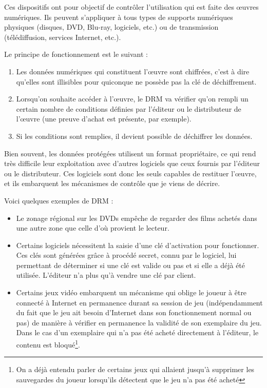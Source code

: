 Ces dispositifs ont pour objectif de contrôler l'utilisation qui est faite des œuvres numériques.
Ils peuvent s'appliquer à tous types de supports numériques physiques (disques, DVD, Blu-ray, logiciels, etc.) ou de transmission (télédiffusion, services Internet, etc.).

Le principe de fonctionnement est le suivant :

\begin{enumerate}
\item Les données numériques qui constituent l'œuvre sont chiffrées, c'est à dire qu'elles sont illisibles pour quiconque ne possède pas la clé de déchiffrement.
\item Lorsqu'on souhaite accéder à l'œuvre, le DRM va vérifier qu'on rempli un certain nombre de conditions définies par l'éditeur ou le distributeur de l'œuvre (une preuve d'achat est présente, par exemple).
\item Si les conditions sont remplies, il devient possible de déchiffrer les données.
\end{enumerate}

Bien souvent, les données protégées utilisent un format propriétaire, ce qui rend très difficile leur exploitation avec d'autres logiciels que ceux fournis par l'éditeur ou le distributeur.
Ces logiciels sont donc les seuls capables de restituer l'œuvre, et ils embarquent les mécanismes de contrôle que je viens de décrire.

Voici quelques exemples de DRM :

\begin{itemize}
\item  Le zonage régional sur les DVDs empêche de regarder des films achetés dans une autre zone que celle d'où provient le lecteur.
\item Certains logiciels nécessitent la saisie d'une clé d'activation pour fonctionner.
Ces clés sont générées grâce à procédé secret, connu par le logiciel, lui permettant de déterminer si une clé est valide ou pas et si elle a déjà été utilisée.
L'éditeur n'a plus qu'à vendre une clé par client.
\item Certains jeux vidéo embarquent un mécanisme qui oblige le joueur à être connecté à Internet en permanence durant sa session de jeu (indépendamment du fait que le jeu ait besoin d'Internet dans son fonctionnement normal ou pas) de manière à vérifier en permanence la validité de son exemplaire du jeu.
Dans le cas d'un exemplaire qui n'a pas été acheté directement à l'éditeur, le contenu est bloqué\footnote{On a déjà entendu parler de certains jeux qui allaient jusqu'à supprimer les sauvegardes du joueur lorsqu'ils détectent que le jeu n'a pas été acheté}.
\end{itemize}

